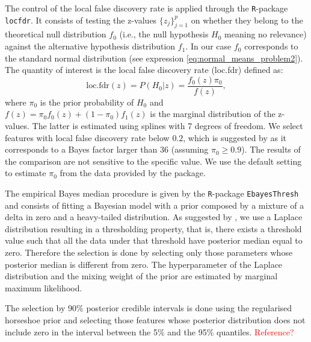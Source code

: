 \documentclass[american,]{article}
\theoremstyle{definition}
\newcommand{\note}[1]{\textcolor{red}{#1}}
\begin{document}
The control of the local false discovery rate is applied through the
\texttt{R}-package \texttt{locfdr}. It consists of testing the
z-values $\{z_{j}\}_{j=1}^{p}$ on whether they belong to the
theoretical null distribution $f_{0}$ (i.e., the null hypothesis $H_0$
meaning no relevance) against the alternative hypothesis distribution
$f_{1}$. In our case $f_{0}$ corresponds to the standard normal
distribution (see expression \eqref{eq:normal_means_problem2}). The
quantity of interest is the local false discovery rate (loc.fdr)
defined as: \
\begin{equation}
\text{loc.fdr}(z)=P(H_{0}|z)=\frac{f_{0}(z)\pi_{0}}{f(z)},
\end{equation}
where $\pi_{0}$ is the prior probability of $H_0$ and
$f(z)=\pi_{0}f_{0}(z)+(1-\pi_{0})f_{1}(z)$ is the marginal
distribution of the z-values. The latter is estimated using splines
with 7 degrees of freedom. We select features with local false
discovery rate below $0.2$, which is suggested by
\citet{efron2012large} as it corresponds to a Bayes factor larger than
36 (assuming $\pi_{0}\geq0.9$). The results of the comparison are not
sensitive to the specific value. We use the default setting to
estimate $\pi_{0}$ from the data provided by the package.

The empirical Bayes median procedure is given by the
\texttt{R}-package \texttt{EbayesThresh} and consists of fitting a
Bayesian model with a prior composed by a mixture of a delta in zero
and a heavy-tailed distribution. As suggested by
\cite{johnstone2004needles}, we use a Laplace distribution resulting
in a thresholding property, that is, there exists a threshold value
such that all the data under that threshold have posterior median
equal to zero. Therefore the selection is done by selecting only those
parameters whose posterior median is different from zero. The
hyperparameter of the Laplace distribution and the mixing weight of
the prior are estimated by marginal maximum likelihood.  

The selection
by 90\% posterior credible intervals is done using the regularised
horseshoe prior and selecting those features whose posterior
distribution does not include zero in the interval between the 5\% and
the 95\% quantiles. \note{Reference?}
\end{document}
